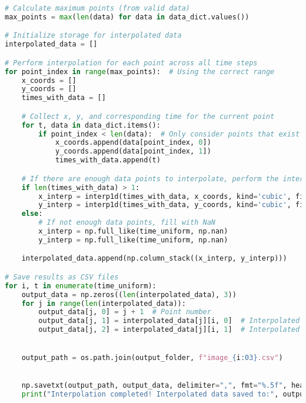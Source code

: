 \documentclass[12pt,a4paper]{article}
\begin{document}
\begin{lstlisting}[language=Python, caption={Interpolation spatiale et temporelle}]
# Calculate maximum points (from valid data)
max_points = max(len(data) for data in data_dict.values())

# Initialize storage for interpolated data
interpolated_data = []

# Perform interpolation for each point across all time steps
for point_index in range(max_points):  # Using the correct range
    x_coords = []
    y_coords = []
    times_with_data = []

    # Collect x, y, and corresponding time for the current point
    for t, data in data_dict.items():
        if point_index < len(data):  # Only consider points that exist at this time step
            x_coords.append(data[point_index, 0])
            y_coords.append(data[point_index, 1])
            times_with_data.append(t)

    # If there are enough data points to interpolate, perform the interpolation
    if len(times_with_data) > 1:
        x_interp = interp1d(times_with_data, x_coords, kind='cubic', fill_value="extrapolate")(time_uniform)
        y_interp = interp1d(times_with_data, y_coords, kind='cubic', fill_value="extrapolate")(time_uniform)
    else:
        # If not enough data points, fill with NaN
        x_interp = np.full_like(time_uniform, np.nan)
        y_interp = np.full_like(time_uniform, np.nan)

    interpolated_data.append(np.column_stack((x_interp, y_interp)))

# Save results as CSV files
for i, t in enumerate(time_uniform):
    output_data = np.zeros((len(interpolated_data), 3))
    for j in range(len(interpolated_data)):
        output_data[j, 0] = j + 1  # Point number
        output_data[j, 1] = interpolated_data[j][i, 0]  # Interpolated x
        output_data[j, 2] = interpolated_data[j][i, 1]  # Interpolated y


    output_path = os.path.join(output_folder, f"image_{i:03}.csv")

    
    np.savetxt(output_path, output_data, delimiter=",", fmt="%.5f", header="num,x,y", comments="")
    print("Interpolation completed! Interpolated data saved to:", output_path)

\end{lstlisting}
\end{document}
